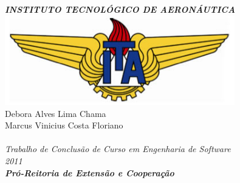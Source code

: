 \begin{titlepage}
	
\begin{center}
\uppercase{\LARGE \bfseries \emph{INSTITUTO TECNOLÓGICO DE AERONÁUTICA}}\\[1.5cm]

\includegraphics[width=0.75\textwidth]{./ita}\\[1.5cm]

\textnormal{\large Debora Alves Lima Chama}\\[-0.3cm]
\textnormal{\large Marcus Vinicius Costa Floriano}\\[1.5cm]

\textnormal{\Large \tcctitle}\\[1.7cm]

\textnormal{\LARGE \emph{Trabalho de Conclusão de Curso em Engenharia de Software}}\\[0.1cm]
\textnormal{\LARGE \emph{2011}}\\[1.2cm]

\textnormal{\Huge \bfseries \emph{Pró-Reitoria de Extensão e Cooperação}}\\[0cm]

\end{center}

\end{titlepage}


